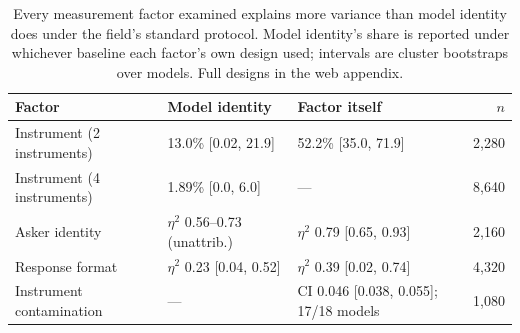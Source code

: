 \documentclass[11pt]{article}
\begin{document}
\begin{table}[H]
\centering
\caption{Every measurement factor examined explains more variance than
model identity does under the field's standard protocol. Model identity's
share is reported under whichever baseline each factor's own design used;
intervals are cluster bootstraps over models. Full designs in the web
appendix.}
\label{tab:factors}
\renewcommand{\arraystretch}{1.35}
\begin{tabular}{lp{4.6cm}p{4.6cm}r}
\toprule
Factor & Model identity & Factor itself & $n$ \\
\midrule
Instrument (2 instruments) & 13.0\% [0.02, 21.9] & 52.2\% [35.0, 71.9] & 2{,}280 \\
Instrument (4 instruments) & 1.89\% [0.0, 6.0] & --- & 8{,}640 \\
Asker identity & $\eta^2$ 0.56--0.73 (unattrib.) & $\eta^2$ 0.79 [0.65, 0.93] & 2{,}160 \\
Response format & $\eta^2$ 0.23 [0.04, 0.52] & $\eta^2$ 0.39 [0.02, 0.74] & 4{,}320 \\
Instrument contamination & --- & CI 0.046 [0.038, 0.055]; 17/18 models & 1{,}080 \\
\bottomrule
\end{tabular}
\end{table}

\clearpage


\end{document}
